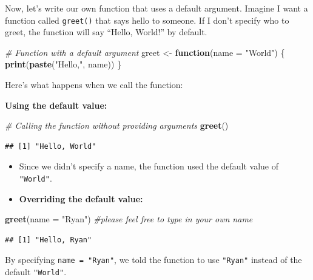 \documentclass[
]{book}
\newenvironment{Shaded}{\begin{snugshade}}{\end{snugshade}}
\newcommand{\AttributeTok}[1]{\textcolor[rgb]{0.13,0.29,0.53}{#1}}
\newcommand{\CommentTok}[1]{\textcolor[rgb]{0.56,0.35,0.01}{\textit{#1}}}
\newcommand{\ControlFlowTok}[1]{\textcolor[rgb]{0.13,0.29,0.53}{\textbf{#1}}}
\newcommand{\FunctionTok}[1]{\textcolor[rgb]{0.13,0.29,0.53}{\textbf{#1}}}
\newcommand{\NormalTok}[1]{#1}
\newcommand{\OtherTok}[1]{\textcolor[rgb]{0.56,0.35,0.01}{#1}}
\newcommand{\StringTok}[1]{\textcolor[rgb]{0.31,0.60,0.02}{#1}}
\begin{document}
Now, let's write our own function that uses a default argument. Imagine I want a function called \texttt{greet()} that says hello to someone. If I don't specify who to greet, the function will say ``Hello, World!'' by default.

\begin{Shaded}
\begin{Highlighting}[]
\CommentTok{\# Function with a default argument}
\NormalTok{greet }\OtherTok{\textless{}{-}} \ControlFlowTok{function}\NormalTok{(}\AttributeTok{name =} \StringTok{"World"}\NormalTok{) \{}
  \FunctionTok{print}\NormalTok{(}\FunctionTok{paste}\NormalTok{(}\StringTok{"Hello,"}\NormalTok{, name))}
\NormalTok{\}}
\end{Highlighting}
\end{Shaded}

Here's what happens when we call the function:

\textbf{Using the default value:}

\begin{Shaded}
\begin{Highlighting}[]
\CommentTok{\# Calling the function without providing arguments}
\FunctionTok{greet}\NormalTok{() }
\end{Highlighting}
\end{Shaded}

\begin{verbatim}
## [1] "Hello, World"
\end{verbatim}

\begin{itemize}
\item
  Since we didn't specify a name, the function used the default value of \texttt{"World"}.
\item
  \textbf{Overriding the default value:}
\end{itemize}

\begin{Shaded}
\begin{Highlighting}[]
\FunctionTok{greet}\NormalTok{(}\AttributeTok{name =} \StringTok{"Ryan"}\NormalTok{) }\CommentTok{\#please feel free to type in your own name}
\end{Highlighting}
\end{Shaded}

\begin{verbatim}
## [1] "Hello, Ryan"
\end{verbatim}

By specifying \texttt{name\ =\ "Ryan"}, we told the function to use \texttt{"Ryan"} instead of the default \texttt{"World"}.
\end{document}

